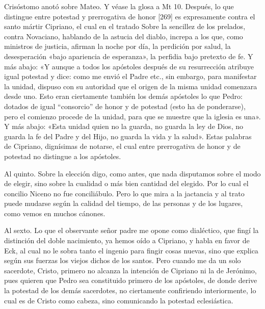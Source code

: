 Crisóstomo anotó sobre Mateo. Y véase la glosa a Mt 10. Después, lo que distingue entre potestad y prerrogativa de honor [269] es expresamente contra el santo mártir Cipriano, el cual en el tratado Sobre la sencillez de los prelados, contra Novaciano, hablando de la astucia del diablo, increpa a los que, como ministros de justicia, afirman la noche por día, la perdición por salud, la desesperación «bajo apariencia de esperanza», la perfidia bajo pretexto de fe. Y más abajo: «Y aunque a todos los apóstoles después de su resurrección atribuye igual potestad y dice: como me envió el Padre etc., sin embargo, para manifestar la unidad, dispuso con su autoridad que el origen de la misma unidad comenzara desde uno. Esto eran ciertamente también los demás apóstoles lo que Pedro: dotados de igual “consorcio” de honor y de potestad (esto ha de ponderarse), pero el comienzo procede de la unidad, para que se muestre que la iglesia es una». Y más abajo: «Esta unidad quien no la guarda, no guarda la ley de Dios, no guarda la fe del Padre y del Hijo, no guarda la vida y la salud». Estas palabras de Cipriano, dignísimas de notarse, el cual entre prerrogativa de honor y de potestad no distingue a los apóstoles.

Al quinto. Sobre la elección digo, como antes, que nada disputamos sobre el modo de elegir, sino sobre la cualidad o más bien cantidad del elegido. Por lo cual el concilio Niceno no fue conciliábulo. Pero lo que mira a la jactancia y al trato puede mudarse según la calidad del tiempo, de las personas y de los lugares, como vemos en muchos cánones.

Al sexto. Lo que el observante señor padre me opone como dialéctico, que fingí la distinción del doble nacimiento, ya hemos oído a Cipriano, y habla en favor de Eck, al cual no le sobra tanto el ingenio para fingir cosas nuevas, sino que explica según sus fuerzas los viejos dichos de los santos. Pero cuando me da un solo sacerdote, Cristo, primero no alcanza la intención de Cipriano ni la de Jerónimo, pues quieren que Pedro sea constituido primero de los apóstoles, de donde derive la potestad de los demás sacerdotes, no ciertamente confiriendo interiormente, lo cual es de Cristo como cabeza, sino comunicando la potestad eclesiástica.

